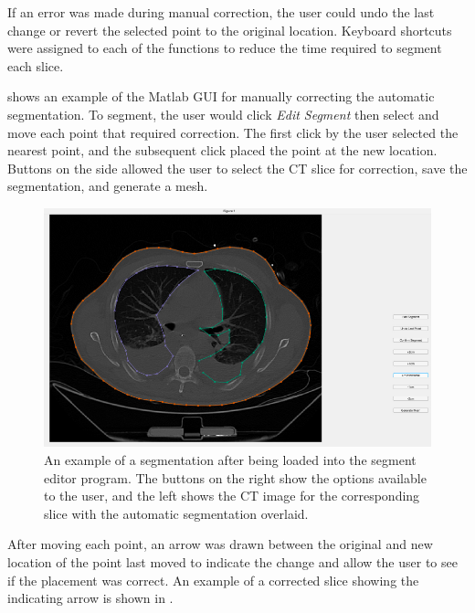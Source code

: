If an error was made during manual correction, the user could undo
the last change or revert the selected point to the original location. 
Keyboard shortcuts were assigned to each of the functions to reduce the time required
to segment each slice.

 shows an example of the Matlab GUI for manually correcting
the automatic segmentation. To segment, the user would click \emph{Edit Segment} 
then select and move each point that required correction. The first click by the user
selected the nearest point, and the subsequent click placed the point at the new location. 
Buttons on the side allowed the user to 
select the CT slice for correction, save the segmentation, and generate a mesh. 

\begin{figure}
	\centering
	\includegraphics[width=\textwidth]{chapter5-CT_to_mesh/imgs/SegmentationAppLoaded.pdf}
	\caption[Manual segmentation interface with initial input]{\label{fig:seg-app-loaded}%
	An example of a segmentation after being loaded into the segment editor program. 
	The buttons on the right show the options available to the user, and the left shows the 
	CT image for the corresponding slice with the automatic segmentation overlaid.
	}
\end{figure}

After moving each point, an arrow was drawn between the original and new location of the
point last moved to indicate the change and allow the user to see if the
placement was correct. An example of a corrected slice showing the indicating arrow 
is shown in .

